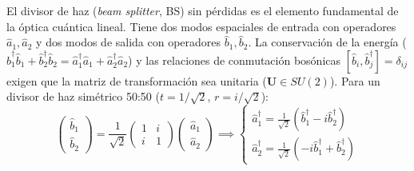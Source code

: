 \documentclass[11pt,a4paper]{book}
\begin{document}
El divisor de haz (\textit{beam splitter}, BS) sin pérdidas es el elemento fundamental de la óptica cuántica lineal. Tiene dos modos espaciales de entrada con operadores $\hat{a}_1, \hat{a}_2$ y dos modos de salida con operadores $\hat{b}_1, \hat{b}_2$. La conservación de la energía ($\hat{b}_1^\dagger \hat{b}_1 + \hat{b}_2^\dagger \hat{b}_2 = \hat{a}_1^\dagger \hat{a}_1 + \hat{a}_2^\dagger \hat{a}_2$) y las relaciones de conmutación bosónicas $[\hat{b}_i, \hat{b}_j^\dagger] = \delta_{ij}$ exigen que la matriz de transformación sea unitaria ($\mathbf{U} \in SU(2)$). Para un divisor de haz simétrico 50:50 ($t = 1/\sqrt{2}$, $r = i/\sqrt{2}$):
\begin{equation}
\begin{pmatrix} \hat{b}_1 \\ \hat{b}_2 \end{pmatrix} = \frac{1}{\sqrt{2}} \begin{pmatrix} 1 & i \\ i & 1 \end{pmatrix} \begin{pmatrix} \hat{a}_1 \\ \hat{a}_2 \end{pmatrix} \implies \begin{cases} \hat{a}_1^\dagger = \frac{1}{\sqrt{2}}(\hat{b}_1^\dagger - i\hat{b}_2^\dagger) \\ \hat{a}_2^\dagger = \frac{1}{\sqrt{2}}(-i\hat{b}_1^\dagger + \hat{b}_2^\dagger) \end{cases}
\end{equation}
\end{document}
